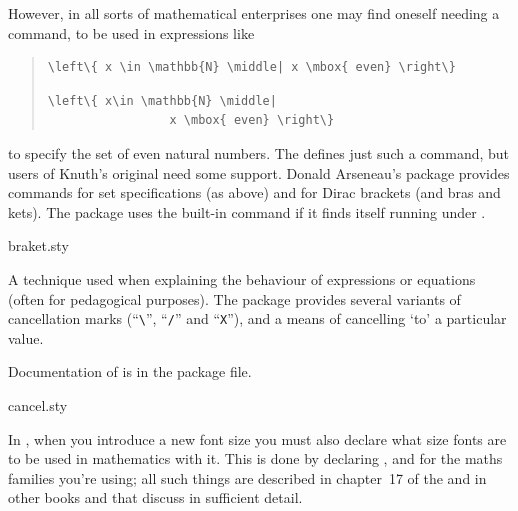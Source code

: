 However, in all sorts of mathematical enterprises one may find oneself
needing a  command, to be used in expressions like
\begin{quote}
\begin{wideversion}
\begin{verbatim}
\left\{ x \in \mathbb{N} \middle| x \mbox{ even} \right\}
\end{verbatim}
\end{wideversion}
\begin{narrowversion}
\begin{verbatim}
\left\{ x\in \mathbb{N} \middle| 
                 x \mbox{ even} \right\}
\end{verbatim}
\end{narrowversion}
\end{quote}
to specify the set of even natural numbers.  The %
defines just such a command, but users of Knuth's original need some
support.  Donald Arseneau's  package provides commands
for set specifications (as above) and for Dirac brackets (and bras and
kets).  The package uses the \eTeX{} built-in command if it finds
itself running under \eTeX{}.
\begin{ctanrefs}
\item[braket.sty]
\end{ctanrefs}


A technique used when explaining the behaviour of expressions or
equations (often for pedagogical purposes).  The 
package provides several variants of cancellation marks
(``\texttt{\textbackslash }'', ``\texttt{/}'' and ``\texttt{X}''), and
a means of cancelling `to' a particular value.

Documentation of  is in the package file.
\begin{ctanrefs}
\item[cancel.sty]
\end{ctanrefs}


In \plaintex{}, when you introduce a new font size you must also
declare what size fonts are to be used in mathematics with it.  This
is done by declaring ,  and
 for the maths families you're using; all such
things are described in chapter~17 of the %
 and in other books and
 that discuss \plaintex{} in sufficient
detail.


